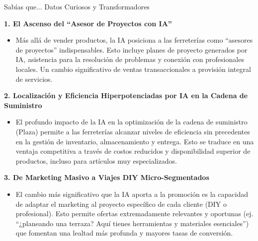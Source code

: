 \documentclass[aspectratio=169]{beamer}
\begin{document}
\begin{frame}{Sabías que... Datos Curiosos y Transformadores}


\textbf{1. El Ascenso del ``Asesor de Proyectos con IA''}

\begin{itemize}
  \item Más allá de vender productos, la IA posiciona a las ferreterías como ``asesores de proyectos'' indispensables. Esto incluye planes de proyecto generados por IA, asistencia para la resolución de problemas y conexión con profesionales locales. Un cambio significativo de ventas transaccionales a provisión integral de servicios.
\end{itemize}
\textbf{2. Localización y Eficiencia Hiperpotenciadas por IA en la Cadena de Suministro}

\begin{itemize}
  \item El profundo impacto de la IA en la optimización de la cadena de suministro (Plaza) permite a las ferreterías alcanzar niveles de eficiencia sin precedentes en la gestión de inventario, almacenamiento y entrega. Esto se traduce en una ventaja competitiva a través de costos reducidos y disponibilidad superior de productos, incluso para artículos muy especializados.
\end{itemize}
\textbf{3. De Marketing Masivo a Viajes DIY Micro-Segmentados}

\begin{itemize}
  \item El cambio más significativo que la IA aporta a la promoción es la capacidad de adaptar el marketing al proyecto específico de cada cliente (DIY o profesional). Esto permite ofertas extremadamente relevantes y oportunas (ej. ``¿planeando una terraza? Aquí tienes herramientas y materiales esenciales'') que fomentan una lealtad más profunda y mayores tasas de conversión.
\end{itemize}
\end{frame}
\end{document}
